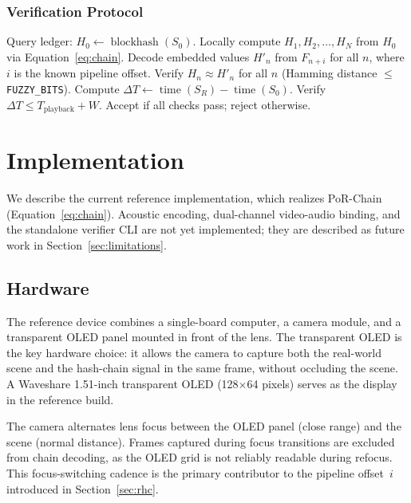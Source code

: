 \documentclass[11pt]{article}
\begin{document}
\subsubsection{Verification Protocol}
\label{sec:computebound}

\begin{algorithm}[H]
\caption{PoR-Chain verification}
\label{alg:verify}
\begin{algorithmic}[1]
\State Query ledger: $H_0 \gets \operatorname{blockhash}(S_0)$.
\State Locally compute $H_1, H_2, \ldots, H_N$ from $H_0$ via Equation~\ref{eq:chain}.
\State Decode embedded values $H'_n$ from $F_{n+i}$ for all $n$, where $i$ is the known pipeline offset.
\State Verify $H_n \approx H'_n$ for all $n$ (Hamming distance $\leq$ \texttt{FUZZY\_BITS}).
\State Compute $\Delta T \gets \operatorname{time}(S_R) - \operatorname{time}(S_0)$.
\State Verify $\Delta T \leq T_{\text{playback}} + W$.
\State Accept if all checks pass; reject otherwise.
\end{algorithmic}
\end{algorithm}


\section{Implementation}
\label{sec:impl}

We describe the current reference implementation, which realizes PoR-Chain
(Equation~\ref{eq:chain}).
Acoustic encoding, dual-channel video-audio binding, and the
standalone verifier CLI are not yet implemented; they are described as future work
in Section~\ref{sec:limitations}.

\subsection{Hardware}

The reference device combines a single-board computer, a camera module, and a
transparent OLED panel mounted in front of the lens. The transparent OLED is the
key hardware choice: it allows the camera to capture both the real-world scene and
the hash-chain signal in the same frame, without occluding the scene. A Waveshare
1.51-inch transparent OLED (128$\times$64 pixels) serves as the display in the
reference build.

The camera alternates lens focus between the OLED panel (close range) and the
scene (normal distance). Frames captured during focus transitions are excluded from
chain decoding, as the OLED grid is not reliably readable during refocus. This
focus-switching cadence is the primary contributor to the pipeline offset~$i$
introduced in Section~\ref{sec:rhc}.
\end{document}
